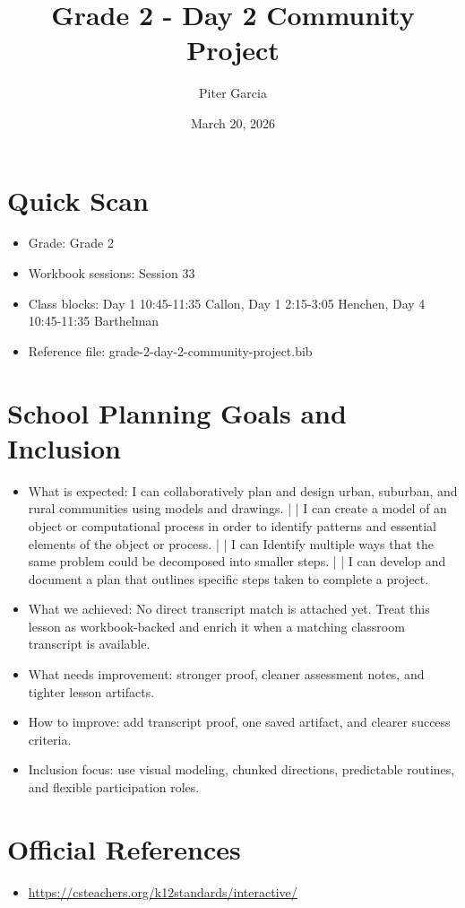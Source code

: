 \documentclass[11pt]{article}
\title{Grade 2 - Day 2 Community Project}
\author{Piter Garcia}
\date{March 20, 2026}
\begin{document}
\maketitle
\section*{Quick Scan}
\begin{itemize}[leftmargin=*]
\item Grade: Grade 2
\item Workbook sessions: Session 33
\item Class blocks: Day 1 10:45-11:35 Callon, Day 1 2:15-3:05 Henchen, Day 4 10:45-11:35 Barthelman
\item Reference file: grade-2-day-2-community-project.bib
\end{itemize}
\section*{School Planning Goals and Inclusion}
\begin{itemize}[leftmargin=*]
\item What is expected: I can collaboratively plan and design urban, suburban, and rural communities using models and drawings. | | I can create a model of an object or computational process in order to identify patterns and essential elements of the object or process. | | I can Identify multiple ways that the same problem could be decomposed into smaller steps. | | I can develop and document a plan that outlines specific steps taken to complete a project.
\item What we achieved: No direct transcript match is attached yet. Treat this lesson as workbook-backed and enrich it when a matching classroom transcript is available.
\item What needs improvement: stronger proof, cleaner assessment notes, and tighter lesson artifacts.
\item How to improve: add transcript proof, one saved artifact, and clearer success criteria.
\item Inclusion focus: use visual modeling, chunked directions, predictable routines, and flexible participation roles.
\end{itemize}
\section*{Official References}
\begin{itemize}[leftmargin=*]
\item \url{https://csteachers.org/k12standards/interactive/}

\end{itemize}
\end{document}
